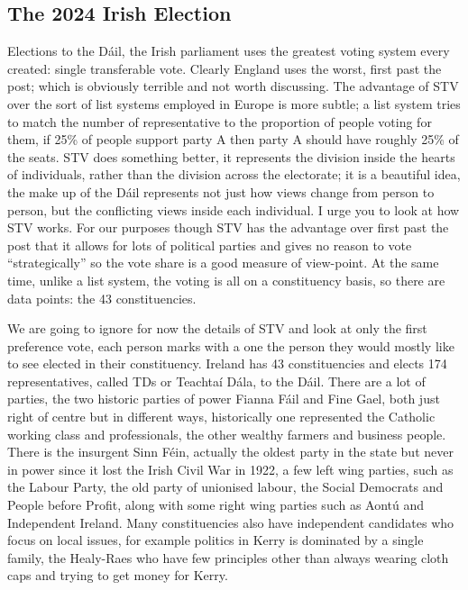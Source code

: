 \documentclass[12pt]{article}
\begin{document}
\subsection*{The 2024 Irish Election}

Elections to the D\'{a}il, the Irish parliament uses the greatest
voting system every created: single transferable vote. Clearly England
uses the worst, first past the post; which is obviously terrible and
not worth discussing.  The advantage of STV over the sort of list
systems employed in Europe is more subtle; a list system tries to
match the number of representative to the proportion of people voting
for them, if 25\% of people support party A then party A should have
roughly 25\% of the seats. STV does something better, it represents
the division inside the hearts of individuals, rather than the
division across the electorate; it is a beautiful idea, the make up of
the D\'{a}il represents not just how views change from person to
person, but the conflicting views inside each individual. I urge you
to look at how STV works. For our purposes though STV has the
advantage over first past the post that it allows for lots of
political parties and gives no reason to vote ``strategically'' so the
vote share is a good measure of view-point. At the same time, unlike a
list system, the voting is all on a constituency basis, so there are
data points: the 43 constituencies.

We are going to ignore for now the details of STV and look at only the
first preference vote, each person marks with a one the person they
would mostly like to see elected in their constituency. Ireland has 43
constituencies and elects 174 representatives, called TDs or
Teachta\'{i} D\'{a}la, to the D\'{a}il. There are a lot of parties,
the two historic parties of power Fianna F\'{a}il and Fine Gael, both
just right of centre but in different ways, historically one
represented the Catholic working class and professionals, the other
wealthy farmers and business people.  There is the insurgent Sinn
F\'{e}in, actually the oldest party in the state but never in power
since it lost the Irish Civil War in 1922, a few left wing parties,
such as the Labour Party, the old party of unionised labour, the
Social Democrats and People before Profit, along with some right wing
parties such as Aont\'{u} and Independent Ireland. Many constituencies
also have independent candidates who focus on local issues, for
example politics in Kerry is dominated by a single family, the
Healy-Raes who have few principles other than always wearing cloth
caps and trying to get money for Kerry.
\end{document}
